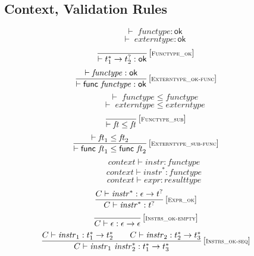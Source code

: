 \documentclass{article}
\begin{document}
\subsection{Context, Validation Rules}
$$
\boxed{{ \vdash }\;{\mathit{functype}} : \mathsf{ok}}
$$
$$
\boxed{{ \vdash }\;{\mathit{externtype}} : \mathsf{ok}}
$$
$$
\begin{array}{@{}c@{}}\displaystyle
\frac{
}{
{ \vdash }\;{t_1^\ast} \rightarrow {t_2^?} : \mathsf{ok}
} \, {[\textsc{\scriptsize Functype\_ok}]}
\qquad
\end{array}
$$
$$
\begin{array}{@{}c@{}}\displaystyle
\frac{
{ \vdash }\;{\mathit{functype}} : \mathsf{ok}
}{
{ \vdash }\;\mathsf{func}~{\mathit{functype}} : \mathsf{ok}
} \, {[\textsc{\scriptsize Externtype\_ok{-}func}]}
\qquad
\end{array}
$$
$$
\boxed{{ \vdash }\;{\mathit{functype}} \leq {\mathit{functype}}}
$$
$$
\boxed{{ \vdash }\;{\mathit{externtype}} \leq {\mathit{externtype}}}
$$
$$
\begin{array}{@{}c@{}}\displaystyle
\frac{
}{
{ \vdash }\;{\mathit{ft}} \leq {\mathit{ft}}
} \, {[\textsc{\scriptsize Functype\_sub}]}
\qquad
\end{array}
$$
$$
\begin{array}{@{}c@{}}\displaystyle
\frac{
{ \vdash }\;{\mathit{ft}}_1 \leq {\mathit{ft}}_2
}{
{ \vdash }\;\mathsf{func}~{\mathit{ft}}_1 \leq \mathsf{func}~{\mathit{ft}}_2
} \, {[\textsc{\scriptsize Externtype\_sub{-}func}]}
\qquad
\end{array}
$$
$$
\boxed{{\mathit{context}} \vdash {\mathit{instr}} : {\mathit{functype}}}
$$
$$
\boxed{{\mathit{context}} \vdash {{\mathit{instr}}^\ast} : {\mathit{functype}}}
$$
$$
\boxed{{\mathit{context}} \vdash {\mathit{expr}} : {\mathit{resulttype}}}
$$
$$
\begin{array}{@{}c@{}}\displaystyle
\frac{
C \vdash {{\mathit{instr}}^\ast} : \epsilon \rightarrow {t^?}
}{
C \vdash {{\mathit{instr}}^\ast} : {t^?}
} \, {[\textsc{\scriptsize Expr\_ok}]}
\qquad
\end{array}
$$
$$
\begin{array}{@{}c@{}}\displaystyle
\frac{
}{
C \vdash \epsilon : \epsilon \rightarrow \epsilon
} \, {[\textsc{\scriptsize Instrs\_ok{-}empty}]}
\qquad
\end{array}
$$
$$
\begin{array}{@{}c@{}}\displaystyle
\frac{
C \vdash {\mathit{instr}}_1 : {t_1^\ast} \rightarrow {t_2^\ast}
 \qquad
C \vdash {\mathit{instr}}_2 : {t_2^\ast} \rightarrow {t_3^\ast}
}{
C \vdash {\mathit{instr}}_1~{{\mathit{instr}}_2^\ast} : {t_1^\ast} \rightarrow {t_3^\ast}
} \, {[\textsc{\scriptsize Instrs\_ok{-}seq}]}
\qquad
\end{array}
$$
\end{document}
